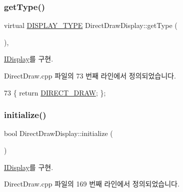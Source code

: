 \subsubsection{\texorpdfstring{get\+Type()}{getType()}}
{\footnotesize\ttfamily virtual \mbox{\hyperlink{_display_8h_aa50f63b0688d0250e0be64d8401d09a0}{D\+I\+S\+P\+L\+A\+Y\+\_\+\+T\+Y\+PE}} Direct\+Draw\+Display\+::get\+Type (\begin{DoxyParamCaption}{ }\end{DoxyParamCaption})\hspace{0.3cm}{\ttfamily [inline]}, {\ttfamily [virtual]}}



\mbox{\hyperlink{class_i_display_a2c7fd4c6721dd8a6992b78f0c588f6f9}{I\+Display}}를 구현.



Direct\+Draw.\+cpp 파일의 73 번째 라인에서 정의되었습니다.


\begin{DoxyCode}
73 \{ \textcolor{keywordflow}{return} \mbox{\hyperlink{_display_8h_aa50f63b0688d0250e0be64d8401d09a0a6673ac9056900ae119f5b5cb24c5fde6}{DIRECT\_DRAW}}; \};
\end{DoxyCode}
\mbox{\label{class_direct_draw_display_a310109ff2530aaa109ed048ede6e1564}} 
\subsubsection{\texorpdfstring{initialize()}{initialize()}}
{\footnotesize\ttfamily bool Direct\+Draw\+Display\+::initialize (\begin{DoxyParamCaption}{ }\end{DoxyParamCaption})\hspace{0.3cm}{\ttfamily [virtual]}}



\mbox{\hyperlink{class_i_display_aa849b5d829138d08cf9efdbb00364a96}{I\+Display}}를 구현.



Direct\+Draw.\+cpp 파일의 169 번째 라인에서 정의되었습니다.


